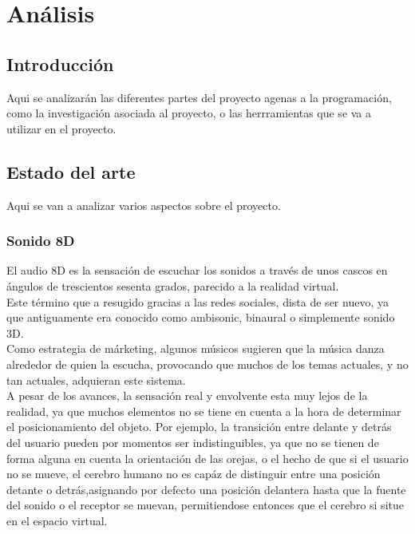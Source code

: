 \section{Análisis}

\subsection{Introducción}

\quad Aqui se analizarán las diferentes partes del proyecto agenas a la programación, como la investigación asociada al proyecto, o las herrramientas que se va a utilizar en el proyecto.\\ 

\subsection{Estado del arte}

\quad Aqui se van a analizar varios aspectos sobre el proyecto.\\

	\subsubsection{Sonido 8D}
\quad El audio 8D es la sensación de escuchar los sonidos a través de unos cascos en ángulos de trescientos sesenta grados, parecido a la realidad virtual.\\ 

\quad Este término que a resugido gracias a las redes sociales, dista de ser nuevo, ya que antiguamente era conocido como ambisonic, binaural o simplemente sonido 3D.\\

\quad Como estrategia de márketing, algunos músicos sugieren que la música danza alrededor de quien la escucha, provocando que muchos de los temas actuales, y no tan actuales, adquieran este sistema.\\

\quad A pesar de los avances, la sensación real y envolvente esta muy lejos de la realidad, ya que muchos elementos no se tiene en cuenta a la hora de determinar el posicionamiento del objeto. Por ejemplo, la transición entre delante y detrás del usuario pueden por momentos ser indistinguibles, ya que no se tienen de forma alguna en cuenta la orientación de las orejas, o el hecho de que si el usuario no se mueve, el cerebro humano no es capáz de distinguir entre una posición detante o detrás,asignando por defecto una posición delantera hasta que la fuente del sonido o el receptor se muevan, permitiendose entonces que el cerebro si situe en el espacio virtual.\\

